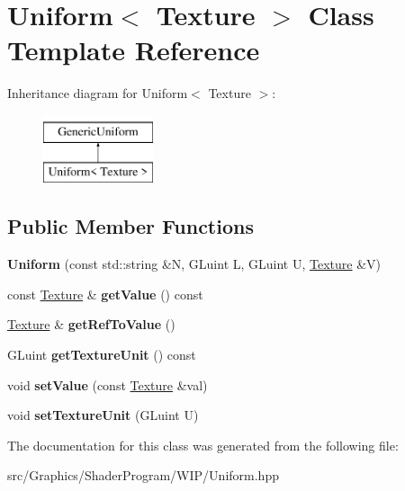 \hypertarget{class_uniform_3_01_texture_01_4}{\section{Uniform$<$ Texture $>$ Class Template Reference}
\label{class_uniform_3_01_texture_01_4}
}
Inheritance diagram for Uniform$<$ Texture $>$\+:\begin{figure}[H]
\begin{center}
\leavevmode
\includegraphics[height=2.000000cm]{class_uniform_3_01_texture_01_4}
\end{center}
\end{figure}
\subsection*{Public Member Functions}
\begin{DoxyCompactItemize}
\item 
\hypertarget{class_uniform_3_01_texture_01_4_a56e03be30efbb0beb0fd356343741ee3}{{\bfseries Uniform} (const std\+::string \&N, G\+Luint L, G\+Luint U, \hyperlink{class_texture}{Texture} \&V)}\label{class_uniform_3_01_texture_01_4_a56e03be30efbb0beb0fd356343741ee3}

\item 
\hypertarget{class_uniform_3_01_texture_01_4_a7e1cb5a42c1766e602ef25d1b6bcb7cf}{const \hyperlink{class_texture}{Texture} \& {\bfseries get\+Value} () const }\label{class_uniform_3_01_texture_01_4_a7e1cb5a42c1766e602ef25d1b6bcb7cf}

\item 
\hypertarget{class_uniform_3_01_texture_01_4_a07a88dbb88bc7a44f21cf4f1bde32193}{\hyperlink{class_texture}{Texture} \& {\bfseries get\+Ref\+To\+Value} ()}\label{class_uniform_3_01_texture_01_4_a07a88dbb88bc7a44f21cf4f1bde32193}

\item 
\hypertarget{class_uniform_3_01_texture_01_4_a43d9c62a0aaca5df68d72dd8c5136eab}{G\+Luint {\bfseries get\+Texture\+Unit} () const }\label{class_uniform_3_01_texture_01_4_a43d9c62a0aaca5df68d72dd8c5136eab}

\item 
\hypertarget{class_uniform_3_01_texture_01_4_af55eb2ce9d0ba8a448ab72ab286ecd8c}{void {\bfseries set\+Value} (const \hyperlink{class_texture}{Texture} \&val)}\label{class_uniform_3_01_texture_01_4_af55eb2ce9d0ba8a448ab72ab286ecd8c}

\item 
\hypertarget{class_uniform_3_01_texture_01_4_a747f5b109a680fe9f8a7ca03618f8200}{void {\bfseries set\+Texture\+Unit} (G\+Luint U)}\label{class_uniform_3_01_texture_01_4_a747f5b109a680fe9f8a7ca03618f8200}

\end{DoxyCompactItemize}


The documentation for this class was generated from the following file\+:\begin{DoxyCompactItemize}
\item 
src/\+Graphics/\+Shader\+Program/\+W\+I\+P/Uniform.\+hpp\end{DoxyCompactItemize}
